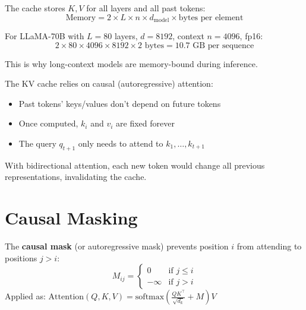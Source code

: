 \begin{remark}
    The cache stores $K, V$ for all layers and all past tokens:
    \[
        \text{Memory} = 2 \times L \times n \times d_{\text{model}} \times \text{bytes per element}
    \]

    For LLaMA-70B with $L = 80$ layers, $d = 8192$, context $n = 4096$, fp16:
    \[
        2 \times 80 \times 4096 \times 8192 \times 2 \text{ bytes} = 10.7 \text{ GB per sequence}
    \]

    This is why long-context models are memory-bound during inference.
\end{remark}

\begin{remark}
    The KV cache relies on causal (autoregressive) attention:
    \begin{itemize}
        \item Past tokens' keys/values don't depend on future tokens
        \item Once computed, $k_i$ and $v_i$ are fixed forever
        \item The query $q_{t+1}$ only needs to attend to $k_1, \ldots, k_{t+1}$
    \end{itemize}

    With bidirectional attention, each new token would change all previous representations, invalidating the cache.
\end{remark}

\section{Causal Masking}

\begin{definition}
    The \textbf{causal mask} (or autoregressive mask) prevents position $i$ from attending to positions $j > i$:
    \[
        M_{ij} = \begin{cases} 0 & \text{if } j \leq i \\ -\infty & \text{if } j > i \end{cases}
    \]
    Applied as: $\text{Attention}(Q, K, V) = \text{softmax}\left(\frac{QK^\top}{\sqrt{d_k}} + M\right) V$
\end{definition}


